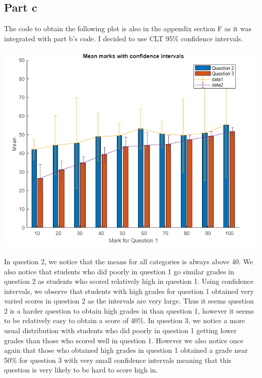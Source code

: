 \documentclass[10pt]{article}
\begin{document}
\subsection*{Part c}
The code to obtain the following plot is also in the appendix section F as it was integrated with part b's code.
I decided to use CLT 95\% confidence intervals.
\begin{center}
    \includegraphics[scale=0.45]{final_c}
\end{center}
In question 2, we notice that the means for all categories is always above
40. We also notice that students who did poorly in question 1 go similar grades in question 2
as students who scored relatively high in question 1. 
Using confidence intervals, we observe that students with high grades for question
1 obtained very varied scores in question 2 as the intervals are very large. 
Thus it seems question 2 is a harder question to obtain high grades in than question 1, however it seems to be 
relatively easy to obtain a score of 40\%. 
In question 3, we notice a more usual distribution with students who did poorly in question 1 getting lower grades than
those who scored well in question 1. However we also notice once again that those who obtained high grades
in question 1 obtained a grade near 50\% for question 3 with very small confidence intervals meaning
that this question is very likely to be hard to score high in.
\end{document}
